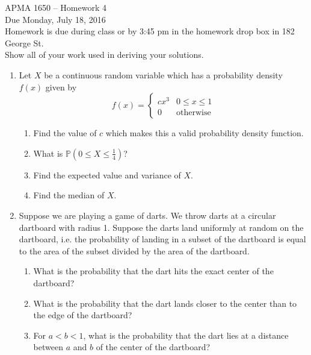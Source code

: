 \documentclass[12pt]{article}
\def\P{{\mathbb P}}
\begin{document}
\title{}
\author{\vspace{-10ex} }

\begin{center}
{\LARGE APMA 1650 -- Homework 4}\\
\vspace{5mm}
{\large Due Monday, July 18, 2016}\\
\vspace{5mm}
Homework is due during class or by 3:45 pm in the homework drop box in 182 George St.\\
Show all of your work used in deriving your solutions.
\end{center}

\begin{enumerate}

\item Let $X$ be a continuous random variable which has a probability density $f(x)$ given by
\[
f(x) = \begin{cases}
c x^3 & 0 \leq x \leq 1 \\
0 & \text{otherwise}
\end{cases}
\]
\begin{enumerate}
\item Find the value of $c$ which makes this a valid probability density function.
\item What is $\P(0 \leq X \leq \frac{1}{4})$?
\item Find the expected value and variance of $X$.
\item Find the median of $X$.
\end{enumerate}

\item Suppose we are playing a game of darts. We throw darts at a circular dartboard with radius 1. Suppose the darts land uniformly at random on the dartboard, i.e. the probability of landing in a subset of the dartboard is equal to the area of the subset divided by the area of the dartboard.
\begin{enumerate}
\item What is the probability that the dart hits the exact center of the dartboard?
\item What is the probability that the dart lands closer to the center than to the edge of the dartboard?
\item For $a < b < 1$, what is the probability that the dart lies at a distance between $a$ and $b$ of the center of the dartboard?
\end{enumerate}


\end{enumerate}
\end{document}
